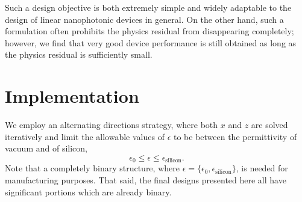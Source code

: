 % 
%     
Such a design objective is both extremely simple and widely adaptable 
    to the design of linear nanophotonic devices in general.
On the other hand, such a formulation often prohibits the physics residual 
    from disappearing completely; 
    however, we find that very good device performance is still obtained
    as long as the physics residual is sufficiently small.

\section{Implementation}
We employ an alternating directions strategy,
    where both $x$ and $z$ are solved iteratively
    and limit the allowable values of $\epsilon$ to be between
    the permittivity of vacuum and of silicon,
    \begin{equation}
    \epsilon_0 \le \epsilon \le \epsilon_\text{silicon}.
    \end{equation}
Note that a completely binary structure,
    where $\epsilon = \{\epsilon_0, \epsilon_\text{silicon}\}$,
    is needed for manufacturing purposes.
That said, the final designs presented here 
    all have significant portions which are already binary.

